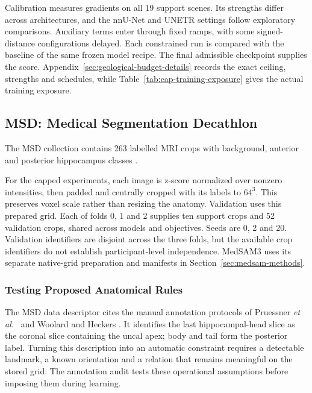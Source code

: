 \documentclass[12pt,a4paper]{article}
\begin{document}
Calibration measures gradients on all 19 support scenes. Its strengths
differ across architectures, and the nnU-Net and UNETR settings follow
exploratory comparisons. Auxiliary terms enter through fixed ramps, with
some signed-distance configurations delayed. Each constrained run is
compared with the baseline of the same frozen model recipe. The final
admissible checkpoint supplies the score. Appendix~\ref{sec:geological-budget-details}
records the exact ceiling, strengths and schedules, while
Table~\ref{tab:cap-training-exposure} gives the actual training exposure.

\subsection{MSD: Medical Segmentation Decathlon}
\label{sec:msd-data-methods}


The MSD collection contains 263 labelled MRI crops with background,
anterior and posterior hippocampus classes \cite{simpson2019dataset}.

For the capped experiments, each image is z-score normalized over nonzero
intensities, then padded and centrally cropped with its labels to $64^3$.
This preserves voxel scale rather than resizing the anatomy. Validation
uses this prepared grid. Each of folds 0, 1 and 2 supplies ten support
crops and 52 validation crops, shared across models and objectives.
Seeds are 0, 2 and 20. Validation identifiers are disjoint across the
three folds, but the available crop identifiers do not establish
participant-level independence. MedSAM3 uses its separate native-grid
preparation and manifests
in Section~\ref{sec:medsam-methods}.

\subsubsection{Testing Proposed Anatomical Rules}
\label{sec:annotation-compatibility}

The MSD data descriptor \cite{simpson2019dataset} cites the manual
annotation protocols of Pruessner \emph{et al.}\ \cite{pruessner2000volumetry}
and Woolard and Heckers \cite{woolard2012asymmetry}.
It identifies the last hippocampal-head slice as the coronal slice
containing the uncal apex; body and tail form the posterior label.
Turning this description
into an automatic constraint requires a detectable landmark, a known
orientation and a relation that remains meaningful on the stored grid.
The annotation audit tests these operational assumptions before imposing
them during learning.
\end{document}
